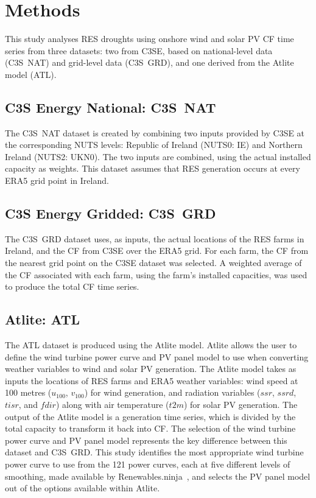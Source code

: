 \documentclass[preprint, 12pt]{elsarticle}
\begin{document}
\section{Methods}
\label{sec:methods}

This study analyses RES droughts using onshore wind and solar PV CF time series from three datasets: two from C3SE, based on national-level data (C3S~NAT) and grid-level data (C3S~GRD), and one derived from the Atlite model (ATL). 

\subsection{C3S Energy National: C3S~NAT}
\label{sec:c3se_n}

The C3S~NAT dataset is created by combining two inputs provided by C3SE at the corresponding NUTS levels: Republic of Ireland (NUTS0: IE) and Northern Ireland (NUTS2: UKN0). The two inputs are combined, using the actual installed capacity as weights. This dataset assumes that RES generation occurs at every ERA5 grid point in Ireland. 

\subsection{C3S Energy Gridded: C3S~GRD}
\label{sec:c3se_g}

The C3S~GRD dataset uses, as inputs, the actual locations of the RES farms in Ireland, and the CF from C3SE over the ERA5 grid. For each farm, the CF from the nearest grid point on the C3SE dataset was selected. A weighted average of the CF associated with each farm, using the farm's installed capacities, was used to produce the total CF time series.

\subsection{Atlite: ATL} 
\label{sec:atlite}

The ATL dataset is produced using the Atlite model. Atlite allows the user to define the wind turbine power curve and PV panel model to use when converting weather variables to wind and solar PV generation. The Atlite model takes as inputs the locations of RES farms and ERA5 weather variables: wind speed at 100 metres ($u_{100}$, $v_{100}$) for wind generation, and radiation variables ($ssr$, $ssrd$, $tisr$, and $fdir$) along with air temperature ($t2m$) for solar PV generation. The output of the Atlite model is a generation time series, which is divided by the total capacity to transform it back into CF. The selection of the wind turbine power curve and PV panel model represents the key difference between this dataset and C3S~GRD. This study identifies the most appropriate wind turbine power curve to use from the 121 power curves, each at five different levels of smoothing, made available by Renewables.ninja~\citep{staffell2016wake}, and selects the PV panel model out of the options available within Atlite.
\end{document}
